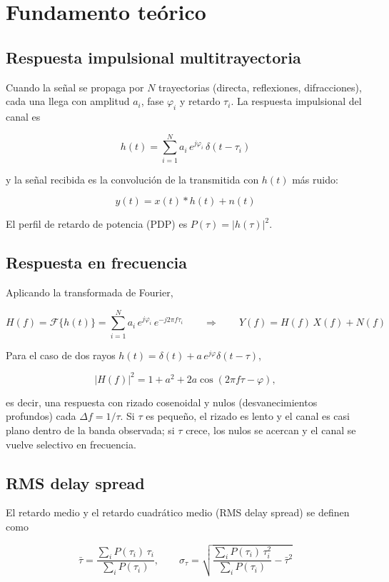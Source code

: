 \documentclass[11pt,a4paper]{article}
\begin{document}
\section{Fundamento teórico}

\subsection{Respuesta impulsional multitrayectoria}

Cuando la señal se propaga por $N$ trayectorias (directa, reflexiones, difracciones), cada una llega con amplitud $a_i$, fase $\varphi_i$ y retardo $\tau_i$. La respuesta impulsional del canal es

\[
h(t)=\sum_{i=1}^{N} a_i\,e^{j\varphi_i}\,\delta(t-\tau_i)
\]

y la señal recibida es la convolución de la transmitida con $h(t)$ más ruido:

\[
y(t)=x(t)*h(t)+n(t)
\]

El perfil de retardo de potencia (PDP) es $P(\tau)=|h(\tau)|^2$.

\subsection{Respuesta en frecuencia}

Aplicando la transformada de Fourier,

\[
H(f)=\mathcal{F}\{h(t)\}=\sum_{i=1}^{N} a_i\,e^{j\varphi_i}\,e^{-j2\pi f\tau_i} \qquad\Longrightarrow\qquad Y(f)=H(f)\,X(f)+N(f)
\]

Para el caso de dos rayos $h(t)=\delta(t)+a\,e^{j\varphi}\delta(t-\tau)$,

\[
|H(f)|^2=1+a^2+2a\cos(2\pi f\tau-\varphi),
\]

es decir, una respuesta con rizado cosenoidal y nulos (desvanecimientos profundos) cada $\Delta f = 1/\tau$. Si $\tau$ es pequeño, el rizado es lento y el canal es casi plano dentro de la banda observada; si $\tau$ crece, los nulos se acercan y el canal se vuelve selectivo en frecuencia.

\subsection{RMS delay spread}

El retardo medio y el retardo cuadrático medio (RMS delay spread) se definen como

\[
\bar{\tau}=\frac{\sum_i P(\tau_i)\,\tau_i}{\sum_i P(\tau_i)}, \qquad
\sigma_\tau=\sqrt{\frac{\sum_i P(\tau_i)\,\tau_i^2}{\sum_i P(\tau_i)}-\bar{\tau}^2}
\]
\end{document}
